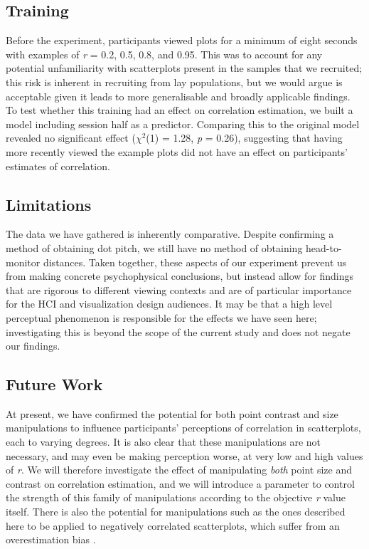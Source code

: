 \documentclass{vgtc}                          %
\begin{document}
\hypertarget{training}{%
\subsection{Training}\label{training}}

Before the experiment, participants viewed plots for a minimum of
eight seconds with examples of \emph{r} = 0.2, 0.5, 0.8, and 0.95. This was to account
for any potential unfamiliarity with scatterplots present in the samples
that we recruited; this risk is inherent in recruiting from lay populations, but we
would argue is acceptable given it leads to more generalisable and broadly
applicable findings. To test whether this training had an effect on correlation estimation,
we built a model including session half as a predictor. Comparing this
to the original model revealed no significant effect (\(\chi^2\)(1)
= 1.28, \emph{p} = 0.26),
suggesting that having more recently viewed the example plots did not have an effect
on participants' estimates of correlation.

\hypertarget{limitations}{%
\subsection{Limitations}\label{limitations}}

The data we have gathered is inherently comparative.
Despite confirming a method of obtaining dot pitch, we still have no method of obtaining
head-to-monitor distances. Taken together, these aspects of our experiment prevent us
from making concrete psychophysical conclusions,
but instead allow for findings that are rigorous to different viewing contexts and
are of particular importance for the HCI and visualization design audiences. It
may be that a high level perceptual phenomenon is responsible for the effects
we have seen here; investigating this is beyond the scope of the current study and
does not negate our findings.

\hypertarget{future-work}{%
\subsection{Future Work}\label{future-work}}

At present, we have confirmed the potential for both point contrast and size
manipulations to influence participants' perceptions of correlation in scatterplots,
each to varying degrees. It is also clear that these manipulations are not necessary,
and may even be making perception worse, at very low and high values of \emph{r}. We will therefore
investigate the effect of manipulating \emph{both} point size and contrast on correlation estimation, and we will introduce a
parameter to control the strength of this family of manipulations according to the
objective \emph{r} value itself. There is also the potential for manipulations
such as the ones described here to be applied to negatively correlated scatterplots,
which suffer from an overestimation bias \cite{sher_2017}.
\end{document}
